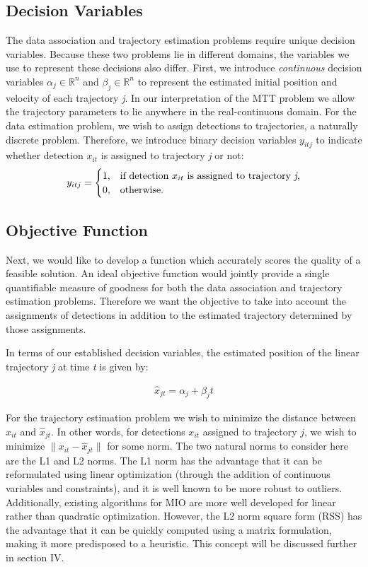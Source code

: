 \documentclass[journal]{IEEEtran}
\begin{document}
\subsection{Decision Variables}
The data association and trajectory estimation problems require unique decision variables. Because these two problems lie in different domains, the variables we use to represent these decisions also differ. First, we introduce \textit{continuous} decision variables $\alpha_{j} \in \mathbb{R}^n$ and $\beta_{j} \in \mathbb{R}^n$ to represent the estimated initial position and velocity of each trajectory \textit{j}.  In our interpretation of the MTT problem we allow the trajectory parameters to lie anywhere in the real-continuous domain. For the data estimation problem, we wish to assign detections to trajectories, a naturally discrete problem. Therefore, we introduce binary decision variables $y_{itj}$ to indicate whether detection $x_{it}$ is assigned to trajectory \textit{j} or not:
\begin{align}
y_{itj} =
\begin{cases}
1, & \text{if detection $x_{it}$ is assigned to trajectory \textit{j},} \\
0, & \text{otherwise.}
\end{cases}
\end{align}

\subsection{Objective Function}
Next, we would like to develop a function which accurately scores the quality of a feasible solution. An ideal objective function would jointly provide a single quantifiable measure of goodness for both the data association and trajectory estimation problems. Therefore we want the objective to take into account the assignments of detections in addition to the estimated trajectory determined by those assignments.

In terms of our established decision variables, the estimated position of the linear trajectory \textit{j} at time \textit{t} is given by:

\begin{align}\label{eq:estimate_pos}
	\hat{x}_{jt} =  \alpha_{j} + \beta_{j}t
\end{align}

For the trajectory estimation problem we wish to minimize the distance between $x_{it}$ and $\hat{x}_{jt}$. In other words, for detections $x_{it}$ assigned to trajectory $j$, we wish to minimize $\|x_{it} - \hat{x}_{jt}\|$ for some norm. The two natural norms to consider here are the L1 and L2 norms. The L1 norm has the advantage that it can be reformulated using linear optimization (through the addition of continuous variables and constraints), and it is well known to be more robust to outliers. Additionally, existing algorithms for MIO are more well developed for linear rather than quadratic optimization. However, the L2 norm square form (RSS) has the advantage that it can be quickly computed using a matrix formulation, making it more predisposed to a heuristic. This concept will be discussed further in section IV.
\end{document}
